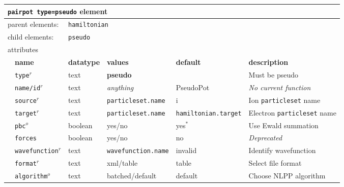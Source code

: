 \FloatBarrier
\begin{table}[h]
\begin{center}
\begin{tabularx}{\textwidth}{l l l l l X }
\hline
\multicolumn{6}{l}{\texttt{pairpot type=pseudo} element} \\
\hline
\multicolumn{2}{l}{parent elements:} & \multicolumn{4}{l}{\texttt{hamiltonian}}\\
\multicolumn{2}{l}{child  elements:} & \multicolumn{4}{l}{\texttt{pseudo}}\\
\multicolumn{2}{l}{attributes}  & \multicolumn{4}{l}{}\\
   &   \bfseries name     & \bfseries datatype & \bfseries values & \bfseries default   & \bfseries description \\
   & \texttt{type}$^r$    &  text              & \textbf{pseudo} &                      & Must be pseudo         \\
   & \texttt{name/id}$^r$ &  text              & \textit{anything}&  PseudoPot          & \textit{No current function}\\
   & \texttt{source}$^r$  &  text              & \texttt{particleset.name} &  i                  & Ion \texttt{particleset} name\\
   & \texttt{target}$^r$  &  text              & \texttt{particleset.name} &\texttt{hamiltonian.target}& Electron \texttt{particleset} name  \\
   & \texttt{pbc}$^o$     &  boolean           & yes/no           & yes$^*$             & Use Ewald summation  \\
   & \texttt{forces}      &  boolean           & yes/no           & no                  & \textit{Deprecated}             \\
   &\texttt{wavefunction}$^r$ &  text          & \texttt{wavefunction.name}& invalid    & Identify wavefunction \\
   &   \texttt{format}$^r$    &  text          & xml/table        & table               & Select file format   \\
   & \texttt{algorithm}$^o$   &  text          & batched/default  & default             & Choose NLPP algorithm \\
  \hline
\end{tabularx}
\end{center}
\end{table}
\FloatBarrier

